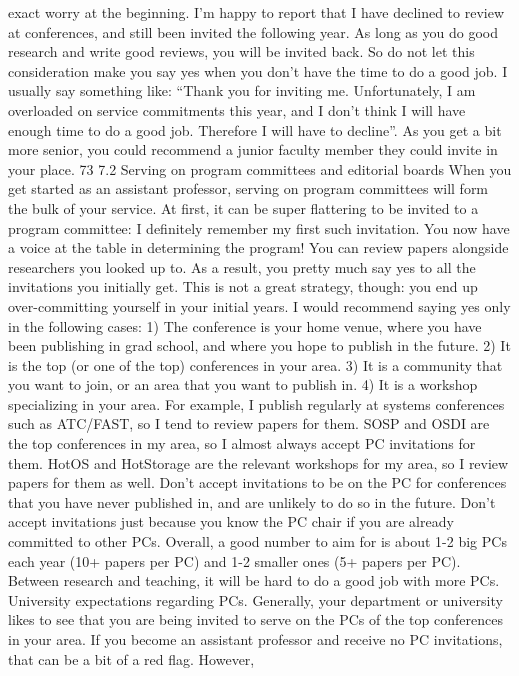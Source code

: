 \documentclass[oneside,11pt]{memoir}
\begin{document}
exact worry at the beginning. I’m happy to report that I have declined to review at conferences,
and still been invited the following year. As long as you do good research and write good
reviews, you will be invited back. So do not let this consideration make you say yes when you
don’t have the time to do a good job.
I usually say something like: “Thank you for inviting me. Unfortunately, I am overloaded on
service commitments this year, and I don’t think I will have enough time to do a good job.
Therefore I will have to decline”. As you get a bit more senior, you could recommend a junior
faculty member they could invite in your place.
73
7.2 Serving on program committees and editorial boards
When you get started as an assistant professor, serving on program committees will form the
bulk of your service. At first, it can be super flattering to be invited to a program committee: I
definitely remember my first such invitation. You now have a voice at the table in determining
the program! You can review papers alongside researchers you looked up to. As a result, you
pretty much say yes to all the invitations you initially get.
This is not a great strategy, though: you end up over-committing yourself in your initial years. I
would recommend saying yes only in the following cases:
1) The conference is your home venue, where you have been publishing in grad school, and
where you hope to publish in the future.
2) It is the top (or one of the top) conferences in your area.
3) It is a community that you want to join, or an area that you want to publish in.
4) It is a workshop specializing in your area.
For example, I publish regularly at systems conferences such as ATC/FAST, so I tend to review
papers for them. SOSP and OSDI are the top conferences in my area, so I almost always accept
PC invitations for them. HotOS and HotStorage are the relevant workshops for my area, so I
review papers for them as well.
Don’t accept invitations to be on the PC for conferences that you have never published in, and
are unlikely to do so in the future. Don’t accept invitations just because you know the PC chair if
you are already committed to other PCs.
Overall, a good number to aim for is about 1-2 big PCs each year (10+ papers per PC) and 1-2
smaller ones (5+ papers per PC). Between research and teaching, it will be hard to do a good job
with more PCs.
University expectations regarding PCs. Generally, your department or university likes to see that
you are being invited to serve on the PCs of the top conferences in your area. If you become an
assistant professor and receive no PC invitations, that can be a bit of a red flag. However,
\end{document}
